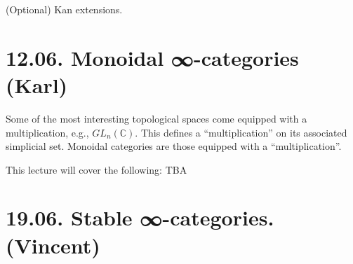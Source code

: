 \documentclass[a4paper]{amsart}
\numberwithin{figure}{section}
\theoremstyle{theorem}
\theoremstyle{definition}
\newcommand{\CC}{\mathbb{C}}
\begin{document}
(Optional) Kan extensions. %


\section{12.06. Monoidal ∞-categories (Karl)} %

Some of the most interesting topological spaces come equipped with a multiplication, e.g., $GL_n(\CC)$. This defines a ``multiplication'' on its associated simplicial set. Monoidal categories are those equipped with a ``multiplication''. %

This lecture will cover the following: TBA



\section{19.06. Stable ∞-categories. (Vincent)}
\end{document}
